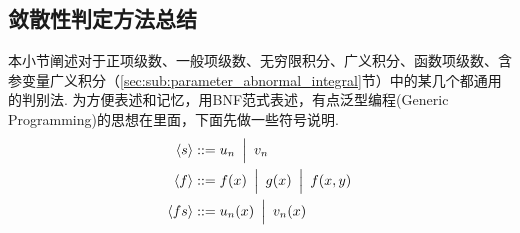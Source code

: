 
\subsection{敛散性判定方法总结}
\label{summary_conver}
本小节阐述对于正项级数、一般项级数、无穷限积分、广义积分、函数项级数、含参变量广义积分（\ref{sec:sub:parameter_abnormal_integral}节）中的某几个都通用的判别法. 为方便表述和记忆，用BNF范式表述，有点泛型编程(Generic Programming)的思想在里面，下面先做一些符号说明.
\[\begin{aligned}
\langle s\rangle&::=u_n\enspace\Big|\enspace v_n\\
\langle f\rangle&::=f(x)\enspace\Big|\enspace g(x)\enspace\Big|\enspace f(x,y)\\
\langle fs\rangle&::=u_n(x)\enspace\Big|\enspace v_n(x)
\end{aligned}\]

